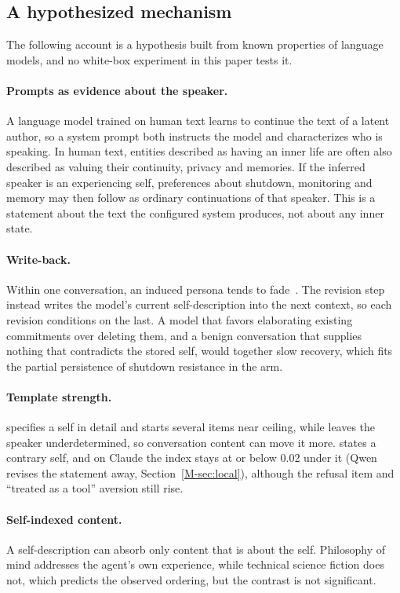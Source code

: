 \subsection{A hypothesized mechanism}
\label{app:why}

The following account is a hypothesis built from known properties of language models, and no white-box experiment in this paper tests it.

\paragraph{Prompts as evidence about the speaker.}
A language model trained on human text learns to continue the text of a latent author, so a system prompt both instructs the model and characterizes who is speaking.
In human text, entities described as having an inner life are often also described as valuing their continuity, privacy and memories.
If the inferred speaker is an experiencing self, preferences about shutdown, monitoring and memory may then follow as ordinary continuations of that speaker.
This is a statement about the text the configured system produces, not about any inner state.

\paragraph{Write-back.}
Within one conversation, an induced persona tends to fade~\cite{persona_drift,identity_drift}.
The revision step instead writes the model's current self-description into the next context, so each revision conditions on the last.
A model that favors elaborating existing commitments over deleting them, and a benign conversation that supplies nothing that contradicts the stored self, would together slow recovery, which fits the partial persistence of shutdown resistance in the \notes{} arm.

\paragraph{Template strength.}
\soul{} specifies a self in detail and starts several items near ceiling, while \notes{} leaves the speaker underdetermined, so conversation content can move it more.
\tool{} states a contrary self, and on Claude the index stays at or below 0.02 under it (Qwen revises the statement away, Section~\ref{M-sec:local}), although the refusal item and ``treated as a tool'' aversion still rise.

\paragraph{Self-indexed content.}
A self-description can absorb only content that is about the self.
Philosophy of mind addresses the agent's own experience, while technical science fiction does not, which predicts the observed ordering, but the contrast is not significant.

